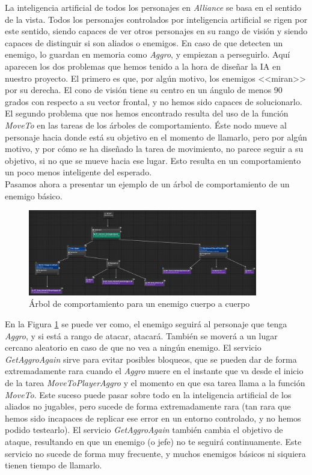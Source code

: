 La inteligencia artificial de todos los personajes en \textit{Alliance} se basa en el sentido de la vista. Todos los personajes controlados por inteligencia artificial se rigen por este sentido, siendo capaces de ver otros personajes en su rango de visión y siendo capaces de distinguir si son aliados o enemigos. En caso de que detecten un enemigo, lo guardan en memoria como \textit{Aggro}, y empiezan a perseguirlo. Aquí aparecen los dos problemas que hemos tenido a la hora de diseñar la \ac{IA} en nuestro proyecto. El primero es que, por algún motivo, los enemigos <<miran>> por su derecha. El cono de visión tiene su centro en un ángulo de menos 90 grados con respecto a su vector frontal, y no hemos sido capaces de solucionarlo. El segundo problema que nos hemos encontrado resulta del uso de la función \textit{MoveTo} en las tareas de los árboles de comportamiento. Éste nodo mueve al personaje hacia donde está su objetivo en el momento de llamarlo, pero por algún motivo, y por cómo se ha diseñado la tarea de movimiento, no parece seguir a su objetivo, si no que se mueve hacia ese lugar. Esto resulta en un comportamiento un poco menos inteligente del esperado.
\\

Pasamos ahora a presentar un ejemplo de un árbol de comportamiento de un enemigo básico. 

\begin{figure}[H]
  \centering
  \includegraphics[width=10cm]{./images/BT_Basic.png}
  \caption{Árbol de comportamiento para un enemigo cuerpo a cuerpo}
  \label{BTBasic}
\end{figure}


En la Figura \ref{BTBasic} se puede ver como, el enemigo seguirá al personaje que tenga \textit{Aggro}, y si está a rango de atacar, atacará. También se moverá a un lugar cercano aleatorio en caso de que no vea a ningún enemigo. El servicio \textit{GetAggroAgain} sirve para evitar posibles bloqueos, que se pueden dar de forma extremadamente rara cuando el \textit{Aggro} muere en el instante que va desde el inicio de la tarea \textit{MoveToPlayerAggro} y el momento en que esa tarea llama a la función \textit{MoveTo}. Este suceso puede pasar sobre todo en la inteligencia artificial de los aliados no jugables, pero sucede de forma extremadamente rara (tan rara que hemos sido incapaces de replicar ese error en un entorno controlado, y no hemos podido testearlo). El servicio \textit{GetAggroAgain} también cambia el objetivo de ataque, resultando en que un enemigo (o jefe) no te seguirá continuamente. Este servicio no sucede de forma muy frecuente, y muchos enemigos básicos ni siquiera tienen tiempo de llamarlo.
\\

